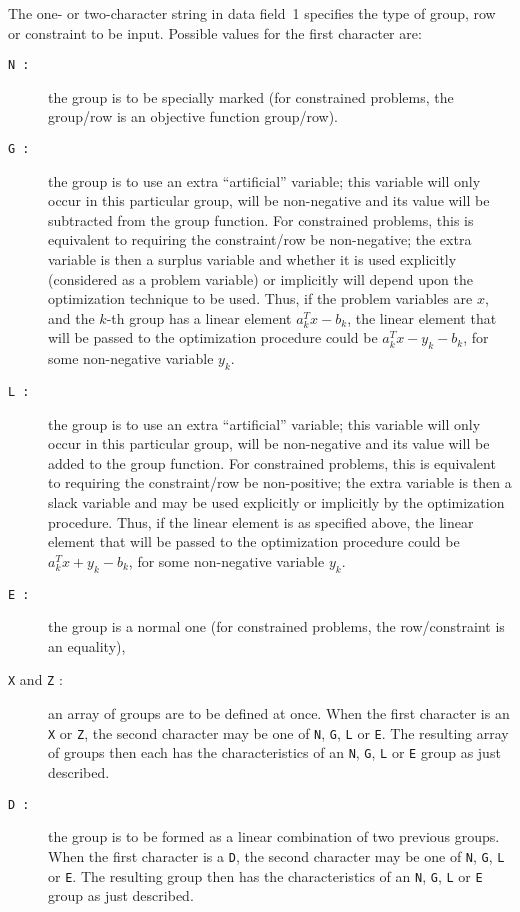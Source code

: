 \documentclass[a4paper]{article}
\begin{document}
The one- or two-character string in data field~1  specifies the type of
group, row or constraint
to  be input.  Possible values for the first
character are:
\begin{description}
\item[\tt N :]
the  group is  to be specially marked   (for constrained problems, the
group/\-row is an objective function group/\-row).
\item[\tt G :]
the group  is to use  an extra  ``artificial'' variable; this variable
will only occur in this particular group, will be non-negative and its
value will be subtracted   from  the group function.  For  constrained
problems,  this is  equivalent  to   requiring   the constraint/row be
non-negative; the  extra   variable is then  a   surplus variable  and
whether it is used  explicitly (considered as  a  problem variable) or
implicitly will  depend  upon  the optimization technique  to be used.
Thus, if the  problem variables are $x$,  and the  $k$-th group has  a
linear element
$a_k^T x - b_k$, the linear element that will be passed
to the optimization procedure could be $a_k^T x - y_k - b_k$, for some
non-negative variable $y_k$.
\item[\tt L :]
the  group is to use an  extra ``artificial''  variable; this variable
will only occur in this particular group, will be non-negative and its
value will be added to the group  function.  For constrained problems,
this is  equivalent to requiring  the constraint/row
be non-positive; the extra variable is then a slack
variable and may be used explicitly or  implicitly by the optimization
procedure.   Thus, if the  linear element
is  as  specified above, the
linear element that will be passed to the optimization procedure could
be $a_k^T x + y_k - b_k$, for some non-negative variable $y_k$.
\item[\tt E :]
the    group   is   a  normal   one  (for   constrained problems,  the
row/constraint is an equality),
\item[{\tt X} {\rm and} {\tt Z} :]
an  array
of  groups  are  to  be  defined at   once.  When the  first
character is an {\tt X} or {\tt Z}, the second character may be one of
{\tt N}, {\tt G}, {\tt L} or {\tt E}.   The  resulting array
of groups
then each has the  characteristics of an {\tt N},  {\tt G}, {\tt L} or
{\tt E} group as just described.
\item[\tt D :]
the group  is to be  formed as  a linear   combination of two previous
groups. When  the  first character is  a {\tt D}, the second character
may be one of {\tt N}, {\tt  G},  {\tt L} or  {\tt  E}.  The resulting
group then has the characteristics of an {\tt N}, {\tt  G}, {\tt L} or
{\tt E} group as just described.
\end{description}
\end{document}
